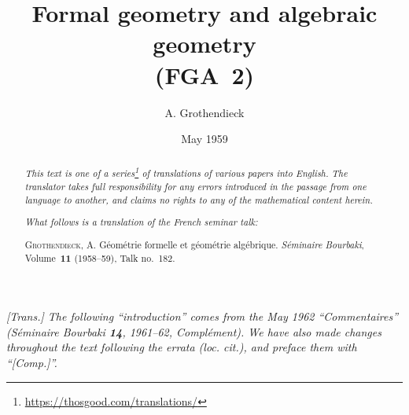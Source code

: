 \documentclass{article}
\title{Formal geometry and algebraic geometry\\(FGA~2)}
\author{A. Grothendieck}
\date{May 1959}
\theoremstyle{plain}
\theoremstyle{definition}
\begin{document}
\maketitle
\thispagestyle{fancy}

\renewcommand{\abstractname}{Translator's note.}

\begin{abstract}
  \renewcommand*{\thefootnote}{\fnsymbol{footnote}}
  \emph{This text is one of a series\footnote{\url{https://thosgood.com/translations/}} of translations of various papers into English.}
  \emph{The translator takes full responsibility for any errors introduced in the passage from one language to another, and claims no rights to any of the mathematical content herein.}

  \medskip
  
  \emph{What follows is a translation of the French seminar talk:}

  \medskip\noindent
  \textsc{Grothendieck, A.}
  G\'{e}om\'{e}trie formelle et g\'{e}om\'{e}trie alg\'{e}brique.
  \emph{S\'{e}minaire Bourbaki}, Volume~\textbf{11} (1958--59), Talk no.~182.
\end{abstract}

\setcounter{footnote}{0}

\tableofcontents



\section*{}

\emph{[Trans.] The following ``introduction'' comes from the May 1962 ``Commentaires'' (\emph{S\'{e}minaire Bourbaki} \textbf{14}, 1961--62, Compl\'{e}ment). We have also made changes throughout the text following the errata (loc. cit.), and preface them with ``[Comp.]''.}
\end{document}
